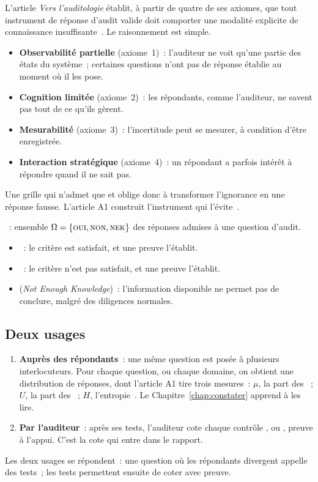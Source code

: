L'article \emph{Vers l'auditologie} établit, à partir de quatre de ses
axiomes, que tout instrument de réponse d'audit valide doit comporter une
modalité explicite de connaissance insuffisante~\cite{minka2026auditologie}.
Le raisonnement est simple.
\begin{itemize}
    \item \textbf{Observabilité partielle} (axiome~1)~: l'auditeur ne voit
          qu'une partie des états du système~; certaines questions n'ont
          pas de réponse établie au moment où il les pose.
    \item \textbf{Cognition limitée} (axiome~2)~: les répondants, comme
          l'auditeur, ne savent pas tout de ce qu'ils gèrent.
    \item \textbf{Mesurabilité} (axiome~3)~: l'incertitude peut se mesurer,
          à condition d'être enregistrée.
    \item \textbf{Interaction stratégique} (axiome~4)~: un répondant a
          parfois intérêt à répondre \OUI{} quand il ne sait pas.
\end{itemize}
Une grille qui n'admet que \OUI{} et \NON{} oblige donc à transformer
l'ignorance en une réponse fausse. L'article A1 construit l'instrument qui
l'évite~\cite{minka2026nek}.

\begin{boxdef}
~: ensemble $\Omega = \{\textsc{oui}, \textsc{non}, \textsc{nek}\}$ des réponses
admises à une question d'audit.
\begin{itemize}
    \item \OUI{}~: le critère est satisfait, et une preuve l'établit.
    \item \NON{}~: le critère n'est pas satisfait, et une preuve l'établit.
    \item \NEK{} (\textit{Not Enough Knowledge})~: l'information disponible
          ne permet pas de conclure, malgré des diligences normales.
\end{itemize}
\end{boxdef}

\subsection{Deux usages}

\begin{enumerate}
    \item \textbf{Auprès des répondants}~: une même question est posée à
          plusieurs interlocuteurs. Pour chaque question, ou chaque domaine,
          on obtient une distribution de réponses, dont l'article A1 tire
          trois mesures~: $\mu$, la part des \OUI{}~; $U$, la part des
          \NEK{}~; $H$, l'entropie~\cite{minka2026nek}. Le
          Chapitre~\ref{chap:constater} apprend à les lire.
    \item \textbf{Par l'auditeur}~: après ses tests, l'auditeur cote chaque
          contrôle \OUI{}, \NON{} ou \NEK{}, preuve à l'appui. C'est la cote
          qui entre dans le rapport.
\end{enumerate}
Les deux usages se répondent~: une question où les répondants divergent
appelle des tests~; les tests permettent ensuite de coter avec preuve.

